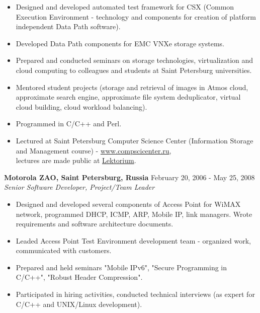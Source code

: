 \documentclass[a4paper,12pt,]{article}
\begin{document}
\begin{description}
\begin{itemize}
    \item Designed and developed automated test framework for CSX (Common Execution Environment - technology and components for creation of platform independent Data Path software). 

    \item Developed Data Path components for EMC VNXe storage systems.

    \item Prepared and conducted seminars on storage technologies, virtualization and cloud computing to colleagues and students at Saint Petersburg universities. 

    \item Mentored student projects (storage and retrieval of images in Atmos cloud, approximate search engine, approximate file system deduplicator, virtual cloud building, cloud workload balancing).

    \item Programmed in C/C++ and Perl.

    \item Lectured at Saint Petersburg Computer Science Center (Information Storage and Management course) - \url{www.compscicenter.ru}, \\
	    lectures are made public at \href{http://www.lektorium.tv/course/?id=22928}{Lektorium}.

    \end{itemize}

  \item{\bfseries Motorola ZAO, Saint Petersburg, Russia} \hfill February 20, 2006 - May 25, 2008 \\
    {\em Senior Software Developer, Project/Team Leader}  

    \begin{itemize}

    \item Designed and developed several components of Access Point for WiMAX network, programmed 
       DHCP, ICMP, ARP, Mobile IP, link managers. Wrote requirements and software architecture documents. 

    \item Leaded Access Point Test Environment development team - organized work, communicated with
       customers. 

    \item Prepared and held seminars "Mobile IPv6", "Secure Programming in C/C++", "Robust Header Compression".

    \item Participated in hiring activities, conducted technical interviews 
        (as expert for C/C++ and UNIX/Linux development).


\end{itemize}
\end{description}
\end{document}
